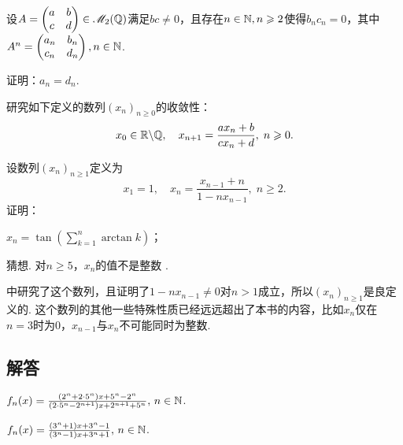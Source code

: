 \begin{problem}
  设$A=\begin{pmatrix}
    a & b \\
    c & d
  \end{pmatrix}\in\mathscr M_2(\mathbb Q)$满足$bc\ne0$，且存在$n\in\mathbb N,n\geqslant2$使得$b_nc_n=0$，其中$A^n=\begin{pmatrix}
    a_n & b_n \\
    c_n & d_n
  \end{pmatrix},n\in\mathbb N$.
  \begin{enum}
    \item\label{prob3.50a} 证明：$a_n=d_n$.
    \item 研究如下定义的数列$(x_n)_{n\ge0}$的收敛性：
    \[
      x_0 \in \mathbb R\backslash \mathbb Q,\quad x_{n+1} = \frac{ax_n+b}{cx_n+d},\; n\geqslant0.
    \]
  \end{enum}
\end{problem}

\begin{mybox}
  \begin{problem}[一个特殊的反正切和的数列.]

    设数列$(x_n)_{n\ge1}$定义为
    \[
      x_1 = 1,\quad x_n = \frac{x_{n-1}+n}{1-nx_{n-1}},\; n\ge2.
    \]
    证明：
    \begin{enum}
      \item $x_n=\tan\left(\sum_{k=1}^n\arctan k\right)$；
      \item {\kaishu 猜想}. 对$n\ge5$，$x_n$的值不是整数 \cite[Conjecture1.2]{3}.
    \end{enum}
  \end{problem}
\end{mybox}
\begin{remark}
  \cite{3} 中研究了这个数列，且证明了$1-nx_{n-1}\ne0$对$n>1$成立，所以$(x_n)_{n\ge1}$是良定义的. 这个数列的其他一些特殊性质已经远远超出了本书的内容，比如$x_n$仅在$n=3$时为0，$x_{n-1}$与$x_n$不可能同时为整数.
\end{remark}

\subsection{解答}
\begin{solution}
  $f_n(x)=\frac{(2^n+2\cdot5^n)x+5^n-2^n}
  {(2\cdot5^n-2^{n+1})x+2^{n+1}+5^n},\,n\in\mathbb N$.
\end{solution}

\begin{solution}
  $f_n(x)=\frac{(3^n+1)x+3^n-1}{(3^n-1)x+3^n+1},\,n\in\mathbb N$.
\end{solution}

